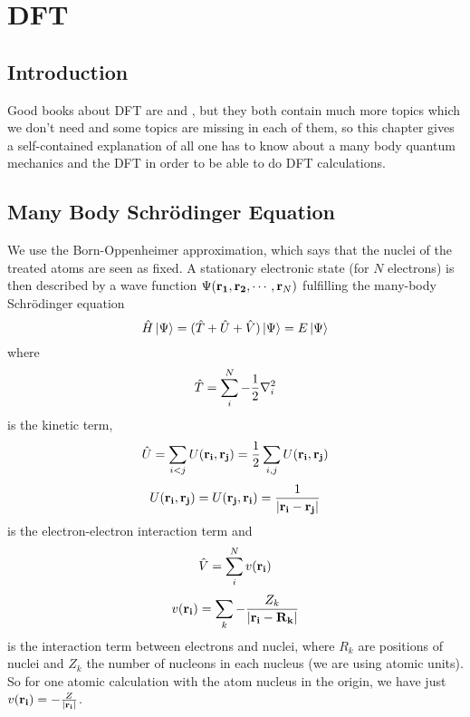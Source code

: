 
\section{DFT}

\subsection{Introduction}

Good books about DFT are \cite{DFT} and \cite{martin}, but they both contain much more topics which we don't need and some topics are missing in each of them, so this chapter gives a self-contained explanation of all one has to know about a many body quantum mechanics and the DFT in order to be able to do DFT calculations.

\subsection{Many Body Schrödinger Equation}

We use the Born-Oppenheimer approximation, which says that the nuclei of the treated atoms are seen as fixed. A stationary electronic state (for $N$ electrons) is then described by a wave function $\Psi({\bf r_1},{\bf r_2},\cdots,{\bf r}_N)$ fulfilling the many-body Schrödinger equation 
\begin{equation*}
  \hat H\mathinner{|{\Psi}\rangle}=(\hat T+\hat U+\hat V)\mathinner{|{\Psi}\rangle}=E\mathinner{|{\Psi}\rangle}
\end{equation*}
where 
\begin{equation*}
  \hat T = \sum_i^N -{1\over2}\nabla_i^2
\end{equation*}
is the kinetic term, 
\begin{equation*}
  \hat U = \sum_{i<j}U({\bf r_i},{\bf r_j})= {1\over2}\sum_{i,j}U({\bf r_i},{\bf r_j})
\end{equation*}
\begin{equation*}
  U({\bf r_i},{\bf r_j})=U({\bf r_j},{\bf r_i})={1\over|{\bf r_i}-{\bf r_j}|}
\end{equation*}
is the electron-electron interaction term and 
\begin{equation*}
  \hat V = \sum_i^N v({\bf r_i})
\end{equation*}
\begin{equation*}
  v({\bf r_i})=\sum_k -{Z_k\over|{\bf r_i}-{\bf R_k}|}
\end{equation*}
is the interaction term between electrons and nuclei, where $R_k$ are positions of nuclei and $Z_k$ the number of nucleons in each nucleus (we are using atomic units). So for one atomic calculation with the atom nucleus in the origin, we have just $v({\bf r_i})=-{Z\over|{\bf r_i}|}$.

